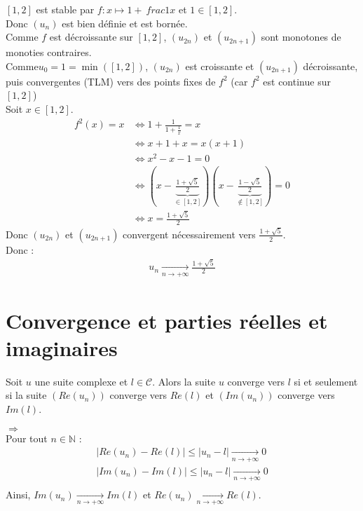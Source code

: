 \documentclass[../main.tex]{subfiles}
\begin{document}
$[1, 2]$ est stable par $f:x\mapsto 1 +\ frac{1}{x}$ et $1 \in [1, 2]$. \\
Donc $(u_n)$ est bien définie et est bornée. \\
Comme $f$ est décroissante sur $[1, 2]$, $(u_{2n})$ et $(u_{2n+1})$ sont monotones de monoties contraires. \\
Comme$u_0 = 1 = \min([1,2])$, $(u_{2n})$ est croissante et $(u_{2n+1})$ décroissante, puis convergentes (TLM) vers des points fixes de $f^2$ (car $f^2$ est continue sur $[1,2]$) \\
Soit $x \in [1, 2]$.
\begin{align*}
    f^2(x) = x &\Leftrightarrow 1 + \frac{1}{1 + \frac{1}{x}} = x \\
    &\Leftrightarrow x + 1 + x = x(x + 1) \\
    &\Leftrightarrow x^2 - x - 1 = 0 \\
    &\Leftrightarrow \left( x - \underbrace{\frac{1 + \sqrt{5}}{2}}_{\in [1, 2]} \right) \left( x - \underbrace{\frac{1 - \sqrt{5}}{2}}_{\not \in [1,2]} \right) = 0 \\
    &\Leftrightarrow x = \frac{1 + \sqrt{5}}{2}
\end{align*}
Donc $(u_{2n})$ et $(u_{2n+1})$ convergent nécessairement vers $\frac{1 + \sqrt{5}}{2}$. \\
Donc : 
\begin{align*}
    u_n \underset{n \to +\infty}{\longrightarrow} \frac{1 + \sqrt{5}}{2}
\end{align*}

\setcounter{section}{71}
\section{Convergence et parties réelles et imaginaires}
\begin{tcolorbox}[title=Théorème 14.72, title filled=false, colframe=orange, colback=orange!10!white]
    Soit $u$ une suite complexe et $l \in \mathcal{C}$. Alors la suite $u$ converge vers $l$ si et seulement si la suite $(Re(u_n))$ converge vers $Re(l)$ et $(Im(u_n))$ converge vers $Im(l)$. 
\end{tcolorbox}

$\boxed{\Rightarrow}$ \\
Pour tout $n \in \mathbb{N}$ : 
\begin{align*}
    |Re(u_n) - Re(l)| \leq |u_n - l| \underset{n \to +\infty}{\longrightarrow} 0 \\
    |Im(u_n) - Im(l)| \leq |u_n - l| \underset{n \to +\infty}{\longrightarrow} 0 \\
\end{align*}
Ainsi, $Im(u_n) \underset{n \to +\infty}{\longrightarrow} Im(l)$ et $Re(u_n) \underset{n \to +\infty}{\longrightarrow} Re(l)$. \\ \\
\end{document}
